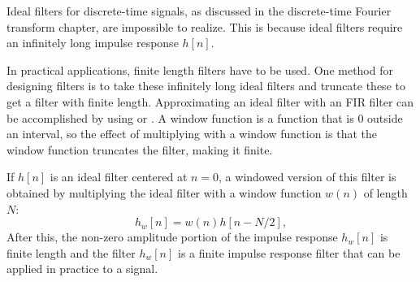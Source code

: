 Ideal filters for discrete-time signals, as discussed in the
discrete-time Fourier transform chapter, are impossible to
realize. This is because ideal filters require an infinitely long
impulse response $h[n]$.

In practical applications, finite length filters have to be used. One method for designing filters is to take these infinitely 
long ideal filters and truncate these to get a filter with finite length. Approximating an ideal filter with an FIR filter can be accomplished by using \emph{} or \emph{}. A window function is a function that is 0 outside an interval, 
so the effect of multiplying with a window function is that the window function truncates the filter, making it finite.

If $h[n]$ is an ideal filter centered at $n=0$, a windowed version of
this filter is obtained by multiplying the ideal filter with a window
function $w(n)$ of length $N$:
\begin{equation}
  h_{w}[n] = w(n)h[n-N/2],
  \label{eq:windowed_filter}
\end{equation}
After this, the non-zero amplitude portion of the impulse response
$h_{w}[n]$ is finite length and the filter $h_w[n]$ is a finite impulse
response filter that can be applied in practice to a signal.

